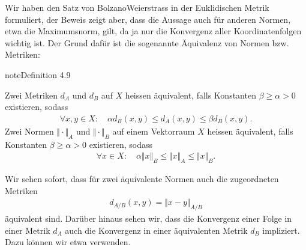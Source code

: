 \documentclass[letterpaper,10pt,english]{jupyterBook}
\begin{document}
Wir haben den Satz von Bolzano\sphinxhyphen{}Weierstrass in der Euklidischen Metrik formuliert, der Beweis zeigt aber, dass die Aussage auch für anderen Normen, etwa die Maximumsnorm, gilt, da ja nur die Konvergenz aller Koordinatenfolgen wichtig ist. Der Grund dafür ist die sogenannte Äquivalenz von Normen bzw. Metriken:
\label{metrik/teilfolgen:definition-6}
\begin{sphinxadmonition}{note}{Definition 4.9}



Zwei Metriken \(d_A\) und \(d_B\) auf \(X\) heissen äquivalent, falls Konstanten \(\beta \geq \alpha > 0\) existieren, sodass
\begin{equation*}
\begin{split}\forall x,y \in X: \quad \alpha  d_B(x,y) \leq d_A(x,y) \leq \beta d_B(x,y) .\end{split}
\end{equation*}
Zwei Normen \(\Vert \cdot \Vert_A\) und \(\Vert \cdot \Vert_B\) auf einem Vektorraum \(X\) heissen äquivalent, falls Konstanten \(\beta \geq \alpha > 0\) existieren, sodass
\begin{equation*}
\begin{split}\forall x  \in X: \quad \alpha  \Vert x \Vert_B  \leq \Vert x \Vert_A  \leq \Vert x \Vert_B  .\end{split}
\end{equation*}\end{sphinxadmonition}

Wir sehen sofort, dass für zwei äquivalente Normen auch die zugeordneten Metriken
\begin{equation*}
\begin{split} d_{A/B}(x,y) = \Vert x -y \Vert_{A/B}\end{split}
\end{equation*}
äquivalent sind.
Darüber hinaus sehen wir, dass die Konvergenz einer Folge in einer Metrik \(d_A\) auch die Konvergenz in einer äquivalenten Metrik \(d_B\) impliziert. Dazu können wir etwa {\hyperref[\detokenize{metrik/konvfolgen:nullfolgenmetrik}]{}} verwenden.
\end{document}
